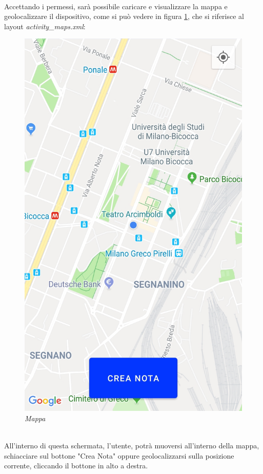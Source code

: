 \\Accettando i permessi, sarà possibile caricare e visualizzare la mappa e geolocalizzare il dispositivo, come si può vedere in figura \ref{fig:mappa}, che si riferisce al layout \textit{activity\_maps.xml}:
\begin{figure}[!h]
    \centering
	\includegraphics[scale=0.15]{Tesi/images/Mappa.jpg}
	\caption{\textit{Mappa}}
	\label{fig:mappa}
\end{figure}
\\All'interno di questa schermata, l'utente, potrà muoversi all'interno della mappa, schiacciare sul bottone "Crea Nota" oppure geolocalizzarsi sulla posizione corrente, cliccando il bottone in alto a destra.
